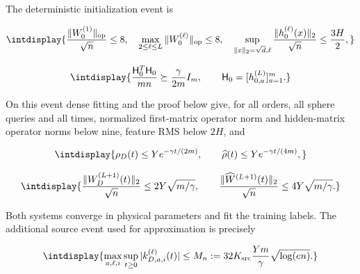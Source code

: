 The deterministic initialization event is


\begingroup\renewcommand{\theHequation}{intdisplay.114}
\begin{equation*}
\intdisplay{
\frac{\|W_0^{(1)}\|_{\rm op}}{\sqrt n}\le8,\quad
\max_{2\le\ell\le L}\|W_0^{(\ell)}\|_{\rm op}\le8,\quad
\sup_{\|x\|_2=\sqrt d,\ell}
\frac{\|h_0^{(\ell)}(x)\|_2}{\sqrt n}\le\frac{3H}2,
}
\end{equation*}
\endgroup

\begingroup\renewcommand{\theHequation}{intdisplay.115}
\begin{equation}
\intdisplay{
\frac{\mathsf H_0^T\mathsf H_0}{mn}
\succeq\frac\gamma{2m}I_m,
\qquad \mathsf H_0=[h_{0,a}^{(L)}]_{a=1}^m.
}
\label{int:eq-0036-legendre-initialization-event}
\end{equation}
\endgroup


On this event dense fitting and the proof below give, for all orders, all sphere queries and all times, normalized first-matrix operator norm and hidden-matrix operator norms below nine, feature RMS below \(2H\), and


\begingroup\renewcommand{\theHequation}{intdisplay.116}
\begin{equation*}
\intdisplay{
\rho_D(t)\le Ye^{-\gamma t/(2m)},\qquad
\widehat\rho(t)\le Ye^{-\gamma t/(4m)},
}
\end{equation*}
\endgroup

\begingroup\renewcommand{\theHequation}{intdisplay.117}
\begin{equation}
\intdisplay{
\frac{\|W_D^{(L+1)}(t)\|_2}{\sqrt n}
\le2Y\sqrt{m/\gamma},\qquad
\frac{\|\widehat W^{(L+1)}(t)\|_2}{\sqrt n}
\le4Y\sqrt{m/\gamma}.
}
\label{int:eq-0037-legendre-physical-bounds}
\end{equation}
\endgroup


Both systems converge in physical parameters and fit the training labels. The additional source event used for approximation is precisely


\begingroup\renewcommand{\theHequation}{intdisplay.118}
\begin{equation}
\intdisplay{
\max_{a,\ell,i}\sup_{t\ge0}|k_{D,a,i}^{(\ell)}(t)|
\le M_n:=32K_{\rm src}\frac{Ym}\gamma\sqrt{\log(en)}.
}
\label{int:eq-0038-legendre-carrier-event}
\end{equation}
\endgroup

